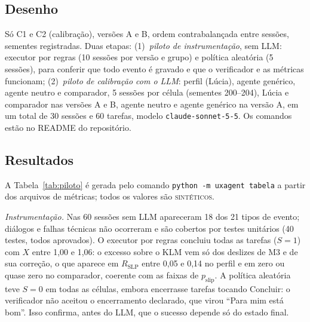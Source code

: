 \documentclass[conference]{IEEEtran}
\begin{document}
\subsection{Desenho}
Só C1 e C2 (calibração), versões A e B, ordem contrabalançada entre sessões, sementes registradas. Duas etapas: (1)~\textit{piloto de instrumentação}, sem LLM: executor por regras (10 sessões por versão e grupo) e política aleatória (5 sessões), para conferir que todo evento é gravado e que o verificador e as métricas funcionam; (2)~\textit{piloto de calibração com o LLM}: perfil (Lúcia), agente genérico, agente neutro e comparador, 5 sessões por célula (sementes 200--204), Lúcia e comparador nas versões A e B, agente neutro e agente genérico na versão A, em um total de 30 sessões e 60 tarefas, modelo \texttt{claude-sonnet-5-5}. Os comandos estão no README do repositório.

\subsection{Resultados}
A Tabela~\ref{tab:piloto} é gerada pelo comando \texttt{python -m uxagent tabela} a partir dos arquivos de métricas; todos os valores são \textsc{sintéticos}.

\begin{table}[!t]
\caption{Métricas do piloto por célula (dados \textsc{sintéticos}). $n$: válidas/iniciadas; $A$: média de ações (entre parênteses, $A_{\min}$ do KLM); $U$: suporte por tarefa (ajuda/dica/por quê); $L$: mediana da latência do LLM; ND: sem oportunidade}
\label{tab:piloto}
\centering
\scriptsize
\setlength{\tabcolsep}{3pt}

\end{table}

\textit{Instrumentação.} Nas 60 sessões sem LLM apareceram 18 dos 21 tipos de evento; diálogos e falhas técnicas não ocorreram e são cobertos por testes unitários (40 testes, todos aprovados). O executor por regras concluiu todas as tarefas ($S=1$) com $X$ entre 1,00 e 1,06: o excesso sobre o KLM vem só dos deslizes de M3 e de sua correção, o que aparece em $R_{\mathrm{SLP}}$ entre 0,05 e 0,14 no perfil e em zero ou quase zero no comparador, coerente com as faixas de $p_{\mathrm{slip}}$. A política aleatória teve $S=0$ em todas as células, embora encerrasse tarefas tocando Concluir: o verificador não aceitou o encerramento declarado, que virou ``Para mim está bom''. Isso confirma, antes do LLM, que o sucesso depende só do estado final.
\end{document}
